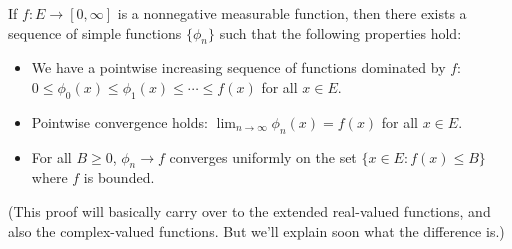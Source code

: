 \begin{theorem}\label{meassimpleapprox}
If $f: E \to [0, \infty]$ is a nonnegative measurable function, then there exists a sequence of simple functions $\{\phi_n\}$ such that the following properties hold:
\begin{itemize}
\item[(a)] We have a pointwise increasing sequence of functions dominated by $f$: $0 \le \phi_0(x) \le \phi_1(x) \le \cdots \le f(x)$ for all $x \in E$.
\item[(b)] Pointwise convergence holds: $\lim_{n \to \infty} \phi_n(x) = f(x)$ for all $x \in E$.
\item[(c)] For all $B \ge 0$, $\phi_n \to f$ converges uniformly on the set $\{x \in E: f(x) \le B\}$ where $f$ is bounded.
\end{itemize}
\end{theorem}

(This proof will basically carry over to the extended real-valued functions, and also the complex-valued functions. But we'll explain soon what the difference is.)

